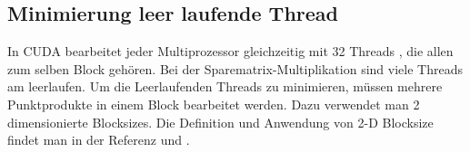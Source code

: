 \subsection{Minimierung leer laufende Thread}

In CUDA bearbeitet jeder Multiprozessor gleichzeitig mit 32 Threads \cite{cudapg}, die allen zum selben Block gehören. Bei der Sparematrix-Multiplikation sind viele Threads am leerlaufen. Um die Leerlaufenden Threads zu minimieren, müssen mehrere Punktprodukte in einem Block bearbeitet werden. Dazu verwendet man 2 dimensionierte Blocksizes. Die Definition und Anwendung von 2-D Blocksize findet man in der Referenz\cite{cudapg} und \cite{cudbp}. 

